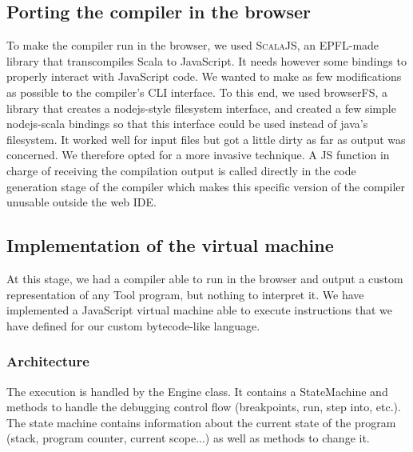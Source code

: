 


\subsection{Porting the compiler in the browser}

To make the compiler run in the browser, we used \textsc{ScalaJS}, an EPFL-made library that transcompiles Scala to JavaScript.
It needs however some bindings to properly interact with JavaScript code. We wanted to make as few modifications as possible to the compiler's CLI interface. To this end, we used browserFS, a library that creates a nodejs-style filesystem interface, and created a few simple nodejs-scala bindings so that this interface could be used instead of java's filesystem. It worked well for input files but got a little dirty as far as output was concerned. We therefore opted for a more invasive technique. A JS function in charge of receiving the compilation output is called directly in the code generation stage of the compiler which makes this specific version of the compiler unusable outside the web IDE.


\subsection{Implementation of the virtual machine}

At this stage, we had a compiler able to run in the browser and output a custom representation of any Tool program, but nothing to interpret it.
We have implemented a JavaScript virtual machine able to execute instructions that we have defined for our custom bytecode-like language.

\subsubsection{Architecture}

The execution is handled by the Engine class. It contains a StateMachine and methods to handle the debugging control flow (breakpoints, run, step into, etc.).
The state machine contains information about the current state of the program (stack, program counter, current scope...) as well as methods to change it.\\

